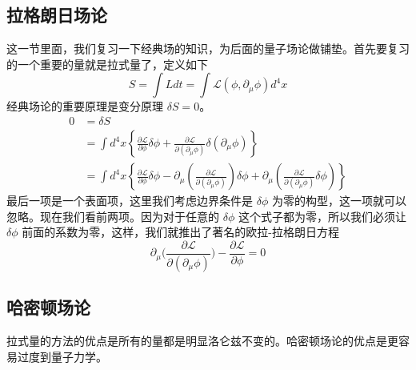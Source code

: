 


\subsection{拉格朗日场论}
这一节里面，我们复习一下经典场的知识，为后面的量子场论做铺垫。首先要复习的一个重要的量就是拉式量了，定义如下
\begin{equation}
S = \int L dt = \int \mathcal L(\phi,\partial_\mu \phi)d^4 x
\end{equation}
经典场论的重要原理是变分原理 $\delta S = 0$。
\begin{equation}
\begin{aligned}
0 &=\delta S \\
&=\int d^{4} x\left\{\frac{\partial \mathcal{L}}{\partial \phi} \delta \phi+\frac{\partial \mathcal{L}}{\partial\left(\partial_{\mu} \phi\right)} \delta\left(\partial_{\mu} \phi\right)\right\} \\
&=\int d^{4} x\left\{\frac{\partial \mathcal{L}}{\partial \phi} \delta \phi-\partial_{\mu}\left(\frac{\partial \mathcal{L}}{\partial\left(\partial_{\mu} \phi\right)}\right) \delta \phi+\partial_{\mu}\left(\frac{\partial \mathcal{L}}{\partial\left(\partial_{\mu} \phi\right)} \delta \phi\right)\right\}
\end{aligned}
\end{equation} 
最后一项是一个表面项，这里我们考虑边界条件是 $\delta \phi$ 为零的构型，这一项就可以忽略。现在我们看前两项。因为对于任意的 $\delta \phi$ 这个式子都为零，所以我们必须让 $\delta \phi$ 前面的系数为零，这样，我们就推出了著名的欧拉-拉格朗日方程
\begin{equation}
\partial_\mu \bigg( \frac{\partial \mathcal L}{\partial(\partial_\mu\phi)} \bigg) - \frac{\partial \mathcal L}{\partial \phi} = 0 
\end{equation}

\subsection{哈密顿场论}
拉式量的方法的优点是所有的量都是明显洛仑兹不变的。哈密顿场论的优点是更容易过度到量子力学。

